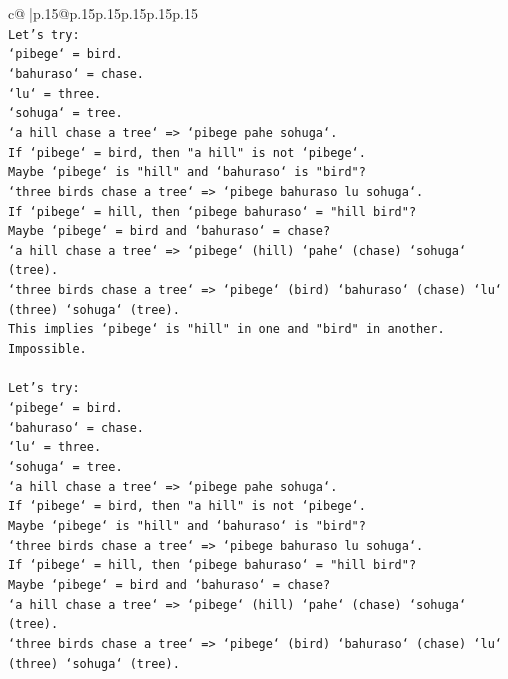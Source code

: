 \documentclass{article}
\begin{document}
{\begin{supertabular}{c@{$\;$}|p{.15\linewidth}@{}p{.15\linewidth}p{.15\linewidth}p{.15\linewidth}p{.15\linewidth}p{.15\linewidth}}
{{{\\ 
\texttt{Let's try:} \\
\texttt{`pibege` = bird.} \\
\texttt{`bahuraso` = chase.} \\
\texttt{`lu` = three.} \\
\texttt{`sohuga` = tree.} \\
\texttt{`a hill chase a tree` => `pibege pahe sohuga`.} \\
\texttt{If `pibege` = bird, then "a hill" is not `pibege`.} \\
\texttt{Maybe `pibege` is "hill" and `bahuraso` is "bird"?} \\
\texttt{`three birds chase a tree` => `pibege bahuraso lu sohuga`.} \\
\texttt{If `pibege` = hill, then `pibege bahuraso` = "hill bird"?} \\
\texttt{Maybe `pibege` = bird and `bahuraso` = chase?} \\
\texttt{`a hill chase a tree` => `pibege` (hill) `pahe` (chase) `sohuga` (tree).} \\
\texttt{`three birds chase a tree` => `pibege` (bird) `bahuraso` (chase) `lu` (three) `sohuga` (tree).} \\
\texttt{This implies `pibege` is "hill" in one and "bird" in another. Impossible.} \\
\\ 
\texttt{Let's try:} \\
\texttt{`pibege` = bird.} \\
\texttt{`bahuraso` = chase.} \\
\texttt{`lu` = three.} \\
\texttt{`sohuga` = tree.} \\
\texttt{`a hill chase a tree` => `pibege pahe sohuga`.} \\
\texttt{If `pibege` = bird, then "a hill" is not `pibege`.} \\
\texttt{Maybe `pibege` is "hill" and `bahuraso` is "bird"?} \\
\texttt{`three birds chase a tree` => `pibege bahuraso lu sohuga`.} \\
\texttt{If `pibege` = hill, then `pibege bahuraso` = "hill bird"?} \\
\texttt{Maybe `pibege` = bird and `bahuraso` = chase?} \\
\texttt{`a hill chase a tree` => `pibege` (hill) `pahe` (chase) `sohuga` (tree).} \\
\texttt{`three birds chase a tree` => `pibege` (bird) `bahuraso` (chase) `lu` (three) `sohuga` (tree).} \\
}}}
\end{supertabular}}
\end{document}
